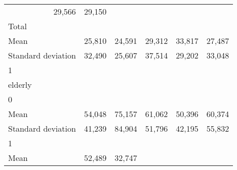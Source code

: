 \begin{tabular}{llllll}
  \multicolumn{1}{r}{29,566} &
  \multicolumn{1}{r}{29,150} \\
\multicolumn{1}{l}{\hspace{3em}Total} &
  \multicolumn{1}{|r}{} &
  \multicolumn{1}{r}{} &
  \multicolumn{1}{r}{} &
  \multicolumn{1}{r}{} &
  \multicolumn{1}{r}{} \\
\multicolumn{1}{l}{\hspace{4em}Mean} &
  \multicolumn{1}{|r}{25,810} &
  \multicolumn{1}{r}{24,591} &
  \multicolumn{1}{r}{29,312} &
  \multicolumn{1}{r}{33,817} &
  \multicolumn{1}{r}{27,487} \\
\multicolumn{1}{l}{\hspace{4em}Standard deviation} &
  \multicolumn{1}{|r}{32,490} &
  \multicolumn{1}{r}{25,607} &
  \multicolumn{1}{r}{37,514} &
  \multicolumn{1}{r}{29,202} &
  \multicolumn{1}{r}{33,048} \\
\multicolumn{1}{l}{\hspace{1em}1} &
  \multicolumn{1}{|r}{} &
  \multicolumn{1}{r}{} &
  \multicolumn{1}{r}{} &
  \multicolumn{1}{r}{} &
  \multicolumn{1}{r}{} \\
\multicolumn{1}{l}{\hspace{2em}elderly} &
  \multicolumn{1}{|r}{} &
  \multicolumn{1}{r}{} &
  \multicolumn{1}{r}{} &
  \multicolumn{1}{r}{} &
  \multicolumn{1}{r}{} \\
\multicolumn{1}{l}{\hspace{3em}0} &
  \multicolumn{1}{|r}{} &
  \multicolumn{1}{r}{} &
  \multicolumn{1}{r}{} &
  \multicolumn{1}{r}{} &
  \multicolumn{1}{r}{} \\
\multicolumn{1}{l}{\hspace{4em}Mean} &
  \multicolumn{1}{|r}{54,048} &
  \multicolumn{1}{r}{75,157} &
  \multicolumn{1}{r}{61,062} &
  \multicolumn{1}{r}{50,396} &
  \multicolumn{1}{r}{60,374} \\
\multicolumn{1}{l}{\hspace{4em}Standard deviation} &
  \multicolumn{1}{|r}{41,239} &
  \multicolumn{1}{r}{84,904} &
  \multicolumn{1}{r}{51,796} &
  \multicolumn{1}{r}{42,195} &
  \multicolumn{1}{r}{55,832} \\
\multicolumn{1}{l}{\hspace{3em}1} &
  \multicolumn{1}{|r}{} &
  \multicolumn{1}{r}{} &
  \multicolumn{1}{r}{} &
  \multicolumn{1}{r}{} &
  \multicolumn{1}{r}{} \\
\multicolumn{1}{l}{\hspace{4em}Mean} &
  \multicolumn{1}{|r}{52,489} &
  \multicolumn{1}{r}{32,747} &

\end{tabular}
